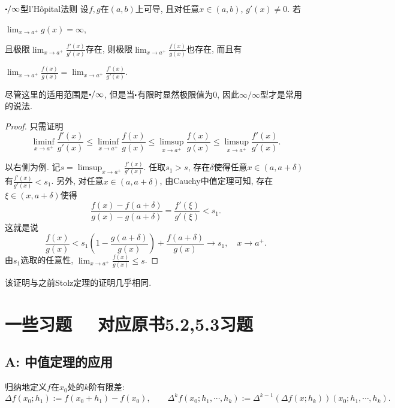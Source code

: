 \begin{theorem}{$\bigcdot/\infty$型l’Hôpital法则}
	设$f,g$在$(a,b)$上可导, 且对任意$x \in (a,b)$, $g'(x) \neq 0$. 若
	
	\begin{center}
		$\lim_{x \to a^+} g(x) = \infty, $
	\end{center}
	
	\noindent
	且极限$\lim_{x \to a^+} \frac{f'(x)}{g'(x)}$存在, 则极限$\lim_{x \to a^+} \frac{f(x)}{g(x)}$也存在, 而且有
	
	\begin{center}
		$\displaystyle \lim_{x \to a^+} \frac{f(x)}{g(x)} = \lim_{x \to a^+} \frac{f'(x)}{g'(x)}. $
	\end{center}
\end{theorem}
\begin{remark}
	尽管这里的适用范围是$\bigcdot/\infty$, 但是当$\bigcdot$有限时显然极限值为$0$, 因此$\infty/\infty$型才是常用的说法. 
\end{remark}
\begin{proof}
	只需证明$$\liminf_{x\to a^+} \frac{f'(x)}{g'(x)} \leq \liminf_{x\to a^+} \frac{f(x)}{g(x)} \leq \limsup_{x\to a^+} \frac{f(x)}{g(x)} \leq \limsup_{x\to a^+} \frac{f'(x)}{g'(x)}.$$
	
	以右侧为例. 记$s = \limsup_{x\to a^+} \frac{f'(x)}{g'(x)}$. 任取$s_1>s$, 存在$\delta$使得任意$x \in (a,a+\delta)$有$\frac{f'(x)}{g'(x)} <s_1$. 另外, 对任意$x \in (a,a+\delta)$, 由Cauchy中值定理可知, 存在$\xi \in (x,a+\delta)$使得$$\frac{f(x)-f(a+\delta)}{g(x)-g(a+\delta)} = \frac{f'(\xi)}{g'(\xi)} <s_1. $$
	这就是说$$\frac{f(x)}{g(x)} < s_1\left( 1-\frac{g(a+\delta)}{g(x)} \right) + \frac{f(a+\delta)}{g(x)} \to s_1,\quad x \to a^+.$$
	由$s_1$选取的任意性, $\lim_{x \to a^+} \frac{f(x)}{g(x)} \leq s$. 
\end{proof}
\begin{remark}
	该证明与之前Stolz定理的证明几乎相同. 
\end{remark}

\newpage
\section*{一些习题 ~~\small 对应原书5.2,5.3习题} \label{sec:ex6.1}

\subsection*{A: 中值定理的应用}

归纳地定义$f$在$x_0$处的$k$阶有限差: $$\Delta f(x_0;h_1) := f(x_0+h_1)-f(x_0), \qquad \Delta ^kf(x_0;h_1,\cdots ,h_k) := \Delta ^{k-1} (\Delta f(x;h_k)) (x_0;h_1,\cdots ,h_k). $$

